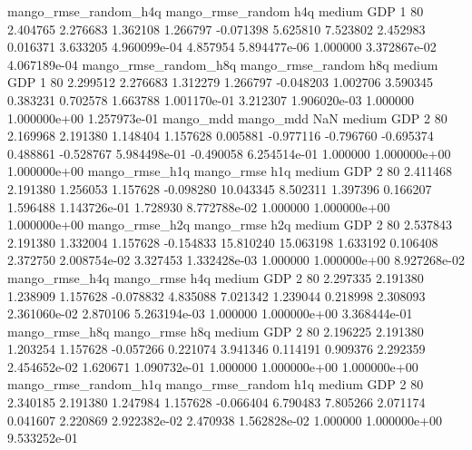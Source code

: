 mango_rmse_random_h4q mango_rmse_random                  h4q     medium      GDP                 1 80  2.404765       2.276683 1.362108       1.266797   -0.071398      5.625810      7.523802     2.452983       0.016371  3.633205 4.960099e-04     4.857954   5.894477e-06            1.000000    3.372867e-02        4.067189e-04
mango_rmse_random_h8q mango_rmse_random                  h8q     medium      GDP                 1 80  2.299512       2.276683 1.312279       1.266797   -0.048203      1.002706      3.590345     0.383231       0.702578  1.663788 1.001170e-01     3.212307   1.906020e-03            1.000000    1.000000e+00        1.257973e-01
            mango_mdd         mango_mdd                  NaN     medium      GDP                 2 80  2.169968       2.191380 1.148404       1.157628    0.005881     -0.977116     -0.796760    -0.695374       0.488861 -0.528767 5.984498e-01    -0.490058   6.254514e-01            1.000000    1.000000e+00        1.000000e+00
       mango_rmse_h1q        mango_rmse                  h1q     medium      GDP                 2 80  2.411468       2.191380 1.256053       1.157628   -0.098280     10.043345      8.502311     1.397396       0.166207  1.596488 1.143726e-01     1.728930   8.772788e-02            1.000000    1.000000e+00        1.000000e+00
       mango_rmse_h2q        mango_rmse                  h2q     medium      GDP                 2 80  2.537843       2.191380 1.332004       1.157628   -0.154833     15.810240     15.063198     1.633192       0.106408  2.372750 2.008754e-02     3.327453   1.332428e-03            1.000000    1.000000e+00        8.927268e-02
       mango_rmse_h4q        mango_rmse                  h4q     medium      GDP                 2 80  2.297335       2.191380 1.238909       1.157628   -0.078832      4.835088      7.021342     1.239044       0.218998  2.308093 2.361060e-02     2.870106   5.263194e-03            1.000000    1.000000e+00        3.368444e-01
       mango_rmse_h8q        mango_rmse                  h8q     medium      GDP                 2 80  2.196225       2.191380 1.203254       1.157628   -0.057266      0.221074      3.941346     0.114191       0.909376  2.292359 2.454652e-02     1.620671   1.090732e-01            1.000000    1.000000e+00        1.000000e+00
mango_rmse_random_h1q mango_rmse_random                  h1q     medium      GDP                 2 80  2.340185       2.191380 1.247984       1.157628   -0.066404      6.790483      7.805266     2.071174       0.041607  2.220869 2.922382e-02     2.470938   1.562828e-02            1.000000    1.000000e+00        9.533252e-01
